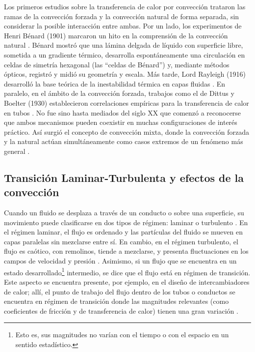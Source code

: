 Los primeros estudios sobre la transferencia de calor por convección trataron las ramas de la convección forzada y la convección natural de forma separada, sin considerar la posible interacción entre ambas. Por un lado, los experimentos de Henri Bénard (1901) marcaron un hito en la comprensión de la convección natural \cite{benard1901}. Bénard mostró que una lámina delgada de líquido con superficie libre, sometida a un gradiente térmico, desarrolla espontáneamente una circulación en celdas de simetría hexagonal (las ``celdas de Bénard'') y, mediante métodos ópticos, registró y midió su geometría y escala. Más tarde, Lord Rayleigh (1916) desarrolló la base teórica de la inestabilidad térmica en capas fluidas \cite{rayleigh1916}. En paralelo, en el ámbito de la convección forzada, trabajos como el de Dittus y Boelter (1930) establecieron correlaciones empíricas para la transferencia de calor en tubos \cite{dittus1930}. No fue sino hasta mediados del siglo XX que comenzó a reconocerse que ambos mecanismos pueden coexistir en muchas configuraciones de interés práctico. Así surgió el concepto de convección mixta, donde la convección forzada y la natural actúan simultáneamente como casos extremos de un fenómeno más general \cite{metais1964}. 

\subsection*{Transición Laminar-Turbulenta y efectos de la convección}

Cuando un fluido se desplaza a través de un conducto o sobre una superficie, su movimiento puede clasificarse en dos tipos de régimen: laminar o turbulento \cite{white}. En el régimen laminar, el flujo es ordenado y las partículas del fluido se mueven en capas paralelas sin mezclarse entre sí. En cambio, en el régimen turbulento, el flujo es caótico, con remolinos, tiende a mezclarse, y presenta fluctuaciones en los campos de velocidad y presión \cite{kundu}. Asimismo, si un flujo que se encuentra en un estado desarrollado\footnote{Esto es, sus magnitudes no varían con el tiempo o con el espacio en un sentido estadístico.} intermedio, se dice que el flujo está en régimen de transición. Este aspecto se encuentra presente, por ejemplo, en el diseño de intercambiadores de calor; allí, el punto de trabajo del flujo dentro de los tubos o conductos se encuentra en régimen de transición donde las magnitudes relevantes (como coeficientes de fricción y de transferencia de calor) tienen una gran variación \cite{ghajar2019heat}. 


